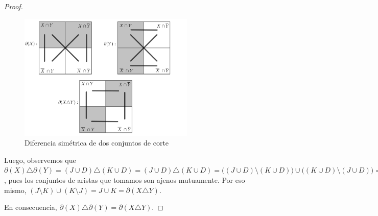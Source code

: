 \begin{proof}
\begin{figure}[H]
    \centering
    \includegraphics[width=0.75\textwidth]{img/imgchapter2/cortessim.jpg}
    \caption{Diferencia simétrica de dos conjuntos de corte}
    \label{fig:cortessim}
\end{figure}

Luego, observemos que $\partial(X) \triangle \partial(Y) = (J \cup D) \triangle (K \cup D) = (J \cup D) \triangle (K \cup D) =  \big((J \cup D) \setminus (K \cup D)\big) \cup  \big((K \cup D) \setminus (J \cup D)\big) = (J \setminus K) \cup (K \setminus J)$, pues los conjuntos de aristas que tomamos son ajenos mutuamente. Por eso mismo, $(J \setminus K) \cup (K \setminus J) = J \cup K = \partial(X \triangle Y).$

En consecuencia, $\partial(X) \triangle \partial(Y) = \partial(X \triangle Y).$


\end{proof}



